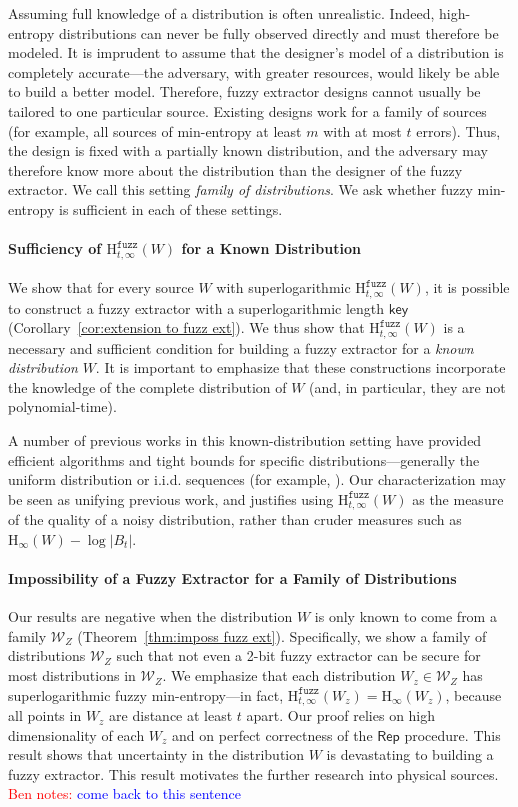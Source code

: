 \documentclass[11pt]{article}
\newcommand{\thref}[1]{\mbox{Theorem~\ref{#1}}}
\newcommand{\corref}[1]{\mbox{Corollary~\ref{#1}}}
\newcommand{\class}[1]{{\ensuremath{\mathsf{#1}}}}
\newcommand{\key}{\ensuremath{\class{key}}\xspace}
\newcommand{\rep}{\ensuremath{\class{Rep}}\xspace}
\newcommand{\Hoo}{\mathrm{H}_\infty}
\newcommand{\Hfuzz}{\mathrm{H}^{\mathtt{fuzz}}_{t,\infty}}
\newcommand{\authnote}[2]{{\textcolor{red}{\textsf{#1 notes: }\textcolor{blue}{ #2}}\marginpar{\textcolor{red}{\textbf{!!!!!}}}}}
\newcommand{\authnote}[2]{}
\newcommand{\bnote}[1]{{\authnote{Ben}{#1}}}
\begin{document}
Assuming full knowledge of a distribution is often unrealistic. Indeed, high-entropy distributions can never be fully observed directly and must therefore be modeled. It is imprudent to assume that the designer's model of a distribution is completely accurate---the adversary, with greater resources, would likely be able to build a better model. Therefore, fuzzy extractor designs cannot usually be tailored to one  particular source. Existing designs work for a family of sources (for example, all sources of min-entropy at least $m$ with at most $t$ errors). Thus, the design is fixed with a partially known distribution, and the adversary may therefore know more about the distribution than the designer of the fuzzy extractor.  We call this setting \emph{family of distributions}.
We ask whether fuzzy min-entropy is sufficient in each of these settings.

\paragraph{Sufficiency of $\Hfuzz(W)$ for a Known Distribution}
We show that for every source $W$ with superlogarithmic $\Hfuzz(W)$, it is possible to construct a fuzzy extractor with a superlogarithmic length $\key$ (\corref{cor:extension to fuzz ext}). We thus show that $\Hfuzz(W)$ is a necessary and sufficient condition for building a fuzzy extractor for a \emph{known distribution} $W$.  It is important to emphasize that these constructions incorporate the knowledge of the complete distribution of $W$ (and, in particular, they are not polynomial-time).

A number of previous works in this known-distribution setting have provided efficient algorithms and
tight bounds for specific distributions---generally the uniform distribution or
i.i.d. sequences (for example, \cite{JW99,LT03,DBLP:conf/eccv/TuylsG04,hao2006combining,DBLP:journals/corr/abs-1112-5630,IgnatenkoW2012}). 
Our characterization may be seen as unifying previous work, and justifies using $\Hfuzz(W)$ as the measure of the quality of a noisy distribution,  rather than cruder measures such as $\Hoo(W)-\log |B_t|$. 


\paragraph{Impossibility of a Fuzzy Extractor for a Family of Distributions}
Our results are negative when the distribution $W$ is only known to come from a family $\mathcal{W}_Z$ (\thref{thm:imposs fuzz ext}).
Specifically, we show a family of distributions $\mathcal{W}_Z$ such that not even a 2-bit fuzzy extractor can be secure for most distributions in  $\mathcal{W}_Z$.  We emphasize that each distribution $W_z\in \mathcal{W}_Z$ has superlogarithmic fuzzy min-entropy---in fact, $\Hfuzz(W_z)=\Hoo(W_z)$, because all points in $W_z$ are distance at least $t$ apart. Our proof relies on high dimensionality of each $W_z$ and on perfect correctness of the $\rep$ procedure.
This result shows that uncertainty in the distribution $W$ is devastating to building a fuzzy extractor.  This result motivates the further research into physical sources.  \bnote{come back to this sentence}
\end{document}
